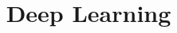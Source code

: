 \documentclass[xcolor=dvipsnames,compress,t,pdf,9pt]{beamer}
\title[\insertframenumber /\inserttotalframenumber]{Deep Learning}
\begin{document}
	\begin{frame}
	\titlepage
	\end{frame}
	
	
	
	
\end{document}
